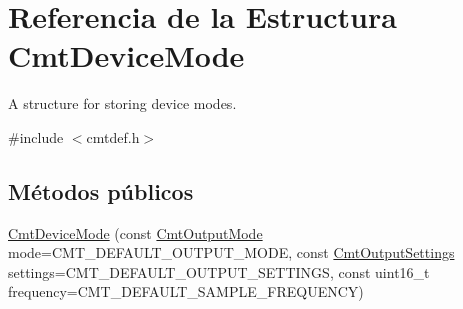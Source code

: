 \hypertarget{structCmtDeviceMode}{\section{\-Referencia de la \-Estructura \-Cmt\-Device\-Mode}
\label{structCmtDeviceMode}
}


\-A structure for storing device modes.  




{\ttfamily \#include $<$cmtdef.\-h$>$}

\subsection*{\-Métodos públicos}
\begin{DoxyCompactItemize}
\item 
\hypertarget{structCmtDeviceMode_a077832e8d7cecbb004795396625f3a74}{\hyperlink{structCmtDeviceMode_a077832e8d7cecbb004795396625f3a74}{\-Cmt\-Device\-Mode} (const \hyperlink{cmtdef_8h_a85df1cdea0bf11e38292e3cd5d69e747}{\-Cmt\-Output\-Mode} mode=\-C\-M\-T\-\_\-\-D\-E\-F\-A\-U\-L\-T\-\_\-\-O\-U\-T\-P\-U\-T\-\_\-\-M\-O\-D\-E, const \hyperlink{cmtdef_8h_a4125efede0d0948ee49291165a1d089b}{\-Cmt\-Output\-Settings} settings=\-C\-M\-T\-\_\-\-D\-E\-F\-A\-U\-L\-T\-\_\-\-O\-U\-T\-P\-U\-T\-\_\-\-S\-E\-T\-T\-I\-N\-G\-S, const uint16\-\_\-t frequency=\-C\-M\-T\-\_\-\-D\-E\-F\-A\-U\-L\-T\-\_\-\-S\-A\-M\-P\-L\-E\-\_\-\-F\-R\-E\-Q\-U\-E\-N\-C\-Y)}\label{structCmtDeviceMode_a077832e8d7cecbb004795396625f3a74}


\end{DoxyCompactItemize}
